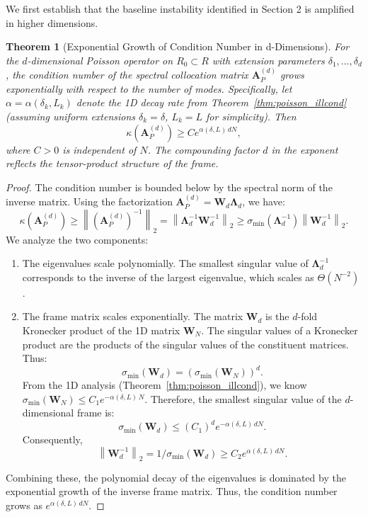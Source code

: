 \documentclass[pdflatex,sn-mathphys-num]{sn-jnl}%
\theoremstyle{thmstyleone}%
\newtheorem{theorem}{Theorem}
\newcommand{\norm}[1]{\left\lVert#1\right\rVert}
\newcommand{\mat}[1]{\mathbf{#1}}
\begin{document}
We first establish that the baseline instability identified in Section 2 is amplified in higher dimensions.

\begin{theorem}[Exponential Growth of Condition Number in d-Dimensions]\label{thm:d_dim_instability}
For the $d$-dimensional Poisson operator on $R_0 \subset R$ with extension parameters $\delta_1, \dots, \delta_d$, the condition number of the spectral collocation matrix $\mat{A}_P^{(d)}$ grows exponentially with respect to the number of modes. Specifically, let $\alpha = \alpha(\delta_k, L_k)$ denote the 1D decay rate from Theorem~\ref{thm:poisson_illcond} (assuming uniform extensions $\delta_k = \delta$, $L_k = L$ for simplicity). Then
\begin{equation} \kappa(\mat{A}_P^{(d)}) \ge C e^{\alpha(\delta, L)\, d N}, \end{equation}
where $C > 0$ is independent of $N$. The compounding factor $d$ in the exponent reflects the tensor-product structure of the frame.
\end{theorem}
\begin{proof}
The condition number is bounded below by the spectral norm of the inverse matrix. Using the factorization $\mat{A}_P^{(d)} = \mat{W}_d \mathbf{\Lambda}_d$, we have:
\begin{equation} \kappa(\mat{A}_P^{(d)}) \ge \norm{(\mat{A}_P^{(d)})^{-1}}_2 = \norm{\mathbf{\Lambda}_d^{-1} \mat{W}_d^{-1}}_2 \ge \sigma_{\min}(\mathbf{\Lambda}_d^{-1}) \norm{\mat{W}_d^{-1}}_2. \end{equation}
We analyze the two components:
\begin{enumerate}
    \item The eigenvalues scale polynomially. The smallest singular value of $\mathbf{\Lambda}_d^{-1}$ corresponds to the inverse of the largest eigenvalue, which scales as $\Theta(N^{-2})$.
    \item The frame matrix scales exponentially. The matrix $\mat{W}_d$ is the $d$-fold Kronecker product of the 1D matrix $\mat{W}_N$. The singular values of a Kronecker product are the products of the singular values of the constituent matrices. Thus:
    \begin{equation} \sigma_{\min}(\mat{W}_d) = (\sigma_{\min}(\mat{W}_N))^d. \end{equation}
    From the 1D analysis (Theorem~\ref{thm:poisson_illcond}), we know $\sigma_{\min}(\mat{W}_N) \le C_1 e^{-\alpha(\delta,L)\, N}$. Therefore, the smallest singular value of the $d$-dimensional frame is:
    \begin{equation} \sigma_{\min}(\mat{W}_d) \le (C_1)^d e^{-\alpha(\delta,L)\, d N}. \end{equation}
    Consequently,
    \begin{equation} \norm{\mat{W}_d^{-1}}_2 = 1/\sigma_{\min}(\mat{W}_d) \ge C_2 e^{\alpha(\delta, L)\, d N}. \end{equation}
\end{enumerate}
Combining these, the polynomial decay of the eigenvalues is dominated by the exponential growth of the inverse frame matrix. Thus, the condition number grows as $e^{\alpha(\delta, L)\, d N}$.
\end{proof}
\end{document}
